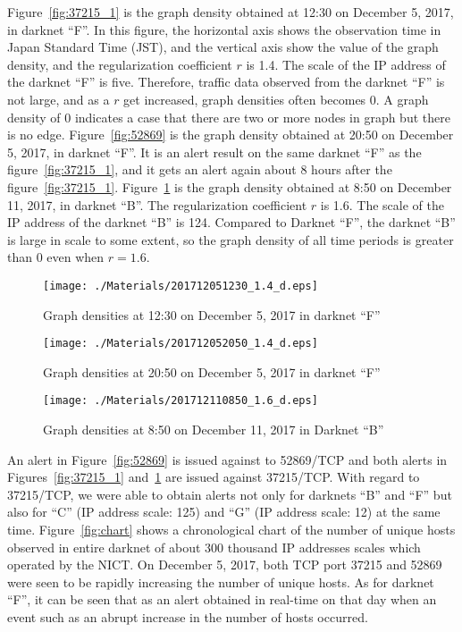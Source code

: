 \documentclass{sig-alternate-10pt}
\begin{document}
Figure~\ref{fig:37215_1} is the graph density obtained at 12:30 on December 5, 2017, in darknet ``F''.
In this figure, the horizontal axis shows the observation time in Japan Standard Time (JST), and the vertical axis show the value of the graph density, and the regularization coefficient $r$ is 1.4.
The scale of the IP address of the darknet ``F'' is five.
Therefore, traffic data observed from the darknet ``F'' is not large, and as a $r$ get increased, graph densities often becomes 0.
A graph density of 0 indicates a case that there are two or more nodes in graph but there is no edge.
Figure~\ref{fig:52869} is the graph density obtained at 20:50 on December 5, 2017, in darknet ``F''.
It is an alert result on the same darknet ``F'' as the figure~\ref{fig:37215_1}, and it gets an alert again about 8 hours after the figure~\ref{fig:37215_1}.
Figure~\ref{fig:37215_2} is the graph density obtained at 8:50 on December 11, 2017, in darknet ``B''.
The regularization coefficient $r$ is 1.6.
The scale of the IP address of the darknet ``B'' is 124.
Compared to Darknet ``F'', the darknet ``B'' is large in scale to some extent, so the graph density of all time periods is greater than 0 even when $r = 1.6$.

\begin{figure}[htb]
\begin{center}
	\texttt{[image: ./Materials/201712051230\_1.4\_d.eps]}
	\caption{Graph densities at 12:30 on December 5, 2017 in darknet ``F''}
  	\label{fig:37215_1}
	\vspace*{0.5cm}
	\texttt{[image: ./Materials/201712052050\_1.4\_d.eps]}
	\caption{Graph densities at 20:50 on December 5, 2017 in darknet ``F''}
  	\label{fig:52869}
	\vspace*{0.5cm}
	\texttt{[image: ./Materials/201712110850\_1.6\_d.eps]}
	\caption{Graph densities at 8:50 on December 11, 2017 in Darknet ``B''}
  	\label{fig:37215_2}
\end{center}
\end{figure}

An alert in Figure~\ref{fig:52869} is issued against to 52869/TCP and both alerts in Figures~\ref{fig:37215_1} and~\ref{fig:37215_2} are issued against 37215/TCP.
With regard to 37215/TCP, we were able to obtain alerts not only for darknets ``B'' and ``F'' but also for ``C'' (IP address scale: 125) and ``G'' (IP address scale: 12) at the same time.
Figure~\ref{fig:chart} shows a chronological chart of the number of unique hosts observed in entire darknet of about 300 thousand IP addresses scales which operated by the NICT.
On December 5, 2017, both TCP port 37215 and 52869 were seen to be rapidly increasing the number of unique hosts.
As for darknet ``F'', it can be seen that as an alert obtained in real-time on that day when an event such as an abrupt increase in the number of hosts occurred.
\end{document}
